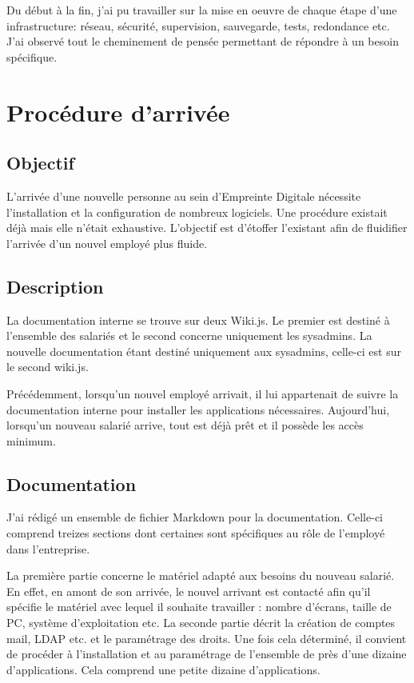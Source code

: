 \documentclass[12pt, a4paper, twoside]{article}
\begin{document}
Du début à la fin, j'ai pu travailler sur la mise en oeuvre de chaque étape d'une infrastructure: réseau, sécurité, supervision, sauvegarde, tests, redondance etc.
J'ai observé tout le cheminement de pensée permettant de répondre à un besoin spécifique.



\newpage
\section{Procédure d'arrivée}
\subsection{Objectif}
L'arrivée d'une nouvelle personne au sein d'Empreinte Digitale nécessite l'installation et la configuration de nombreux logiciels.
Une procédure existait déjà mais elle n'était exhaustive.
L'objectif est d'étoffer l'existant afin de fluidifier l'arrivée d'un nouvel employé plus fluide.

\subsection{Description}
La documentation interne se trouve sur deux Wiki.js.
Le premier est destiné à l'ensemble des salariés et le second concerne uniquement les sysadmins.
La nouvelle documentation étant destiné uniquement aux sysadmins, celle-ci est sur le second wiki.js.

Précédemment, lorsqu'un nouvel employé arrivait, il lui appartenait de suivre la documentation interne pour installer les applications nécessaires.
Aujourd'hui, lorsqu'un nouveau salarié arrive, tout est déjà prêt et il possède les accès minimum. 

\subsection{Documentation}
J'ai rédigé un ensemble de fichier \gls{Markdown} pour la documentation. 
Celle-ci comprend treizes sections dont certaines sont spécifiques au rôle de l'employé dans l'entreprise.

La première partie concerne le matériel adapté aux besoins du nouveau salarié.
En effet, en amont de son arrivée, le nouvel arrivant est contacté afin qu'il spécifie le matériel avec lequel il souhaite travailler : nombre d'écrans, taille de PC, système d'exploitation etc.
La seconde partie décrit la création de comptes mail, \gls{LDAP} etc. et le paramétrage des droits.
Une fois cela déterminé, il convient de procéder à l'installation et au paramétrage de l'ensemble de près d'une dizaine d'applications.
Cela comprend une petite dizaine d'applications.
\end{document}
